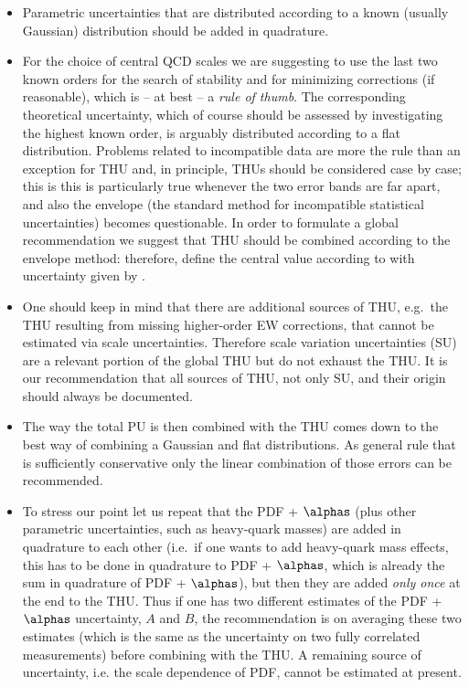 \begin{itemize}

\item Parametric uncertainties that are distributed according to a 
known (usually Gaussian) distribution should be added in quadrature.

\item For the choice of central QCD scales we are suggesting to use the 
last two known orders for the search of stability and for
minimizing corrections (if reasonable), which is -- at best -- a 
{\em rule of thumb}. 
The corresponding theoretical uncertainty, which of course should be assessed 
by investigating the highest known order, 
is arguably distributed according to a flat distribution.
Problems related to incompatible data are more the rule than an exception
for THU and, in principle, THUs should be considered case by case; this is
this is particularly true whenever the two error bands are far apart,
and also the envelope (the standard method for 
incompatible statistical uncertainties) becomes questionable. 
In order to formulate a global recommendation we suggest that THU should be 
combined according to the envelope method: therefore, define the central value 
according to  with uncertainty given by .

\item One should keep in mind that there are additional sources of THU, e.g.\ 
the THU resulting from missing higher-order EW corrections, that cannot be 
estimated via scale uncertainties. Therefore scale variation uncertainties
(SU) are a relevant portion of the global THU but do not exhaust the THU.
It is our recommendation that all sources of THU, not only SU, and their origin 
should always be documented.

\item The way the total PU is then combined with the THU comes down to the best 
way of combining a Gaussian and flat distributions.
As general rule that is sufficiently conservative only the linear combination
of those errors can be recommended.

\item To stress our point let us repeat that the PDF + $\alphas$ (plus
other parametric uncertainties, such as heavy-quark masses) are added in
quadrature to each other (i.e.\ if one wants to add heavy-quark mass effects, 
this has to be done in quadrature to PDF + $\alphas$, which is already the sum 
in quadrature of PDF + $\alphas$), but then they are added {\em only once} at 
the end to the THU.
Thus if one has two different estimates of the PDF + $\alphas$ uncertainty, 
$A$ and $B$, the recommendation is on averaging these two estimates (which is the
same as the uncertainty on two fully correlated measurements) before combining with the 
THU.
A remaining source of uncertainty, i.e. the scale dependence of PDF, cannot be
estimated at present.


\end{itemize}
